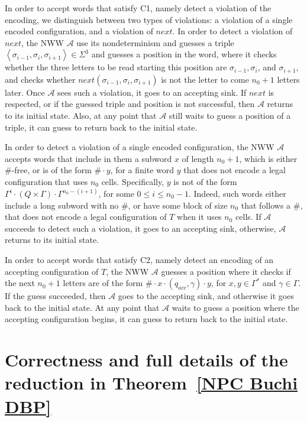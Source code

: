 \documentclass[10pt,a4paper]{amsart}
\theoremstyle{definition}
\numberwithin{equation}{section}
\newcommand{\A}{{\mathcal A}}
\newcommand{\zug}[1]{\left\langle #1 \right\rangle}
\begin{document}
In order to accept words that satisfy C1, namely detect a violation of the encoding, we distinguish between two types of violations: a violation of a single encoded configuration, and a violation of $next$. 
In order to detect a violation of $next$, the NWW $\A$ use its
nondeterminism and guesses a triple $\zug{\sigma_{i-1},\sigma_i,\sigma_{i+1}} \in \Sigma^3$ and guesses a position in the word, where it checks whether the three letters
to be read starting this position are $\sigma_{i-1},\sigma_i$, and
$\sigma_{i+1}$, and checks whether
$next(\sigma_{i-1},\sigma_i,\sigma_{i+1})$ is not the
letter to come $n_0+1$ letters later.
Once $\A$ sees such a violation, it goes to an accepting sink. If $next$ is respected, 
or if the guessed triple and position is not successful, then $\A$ returns to its initial state. Also, at any point that $\A$ still waits to guess a position of a triple, it can guess to return back to the initial state.

In order to detect a violation of a single encoded configuration, the NWW $\A$ accepts words that include in them a subword $x$ of length $n_0+1$, which is either $\#$-free, or is of the form $\#\cdot y$, for a finite word $y$ that does not encode a legal configuration that uses $n_0$ cells. Specifically, $y$ is not of the form $\Gamma^i \cdot (Q\times \Gamma) \cdot \Gamma^{n_0-(i+1)}$, for some $0 \leq i \leq n_0-1$.
Indeed, such words either include a long subword with no $\#$, 
or have some block of size $n_0$ that follows a $\#$, that does not encode a legal configuration of $T$ when it uses $n_0$ cells. 
If $\A$ succeeds to detect such a violation, it goes to an accepting sink, otherwise, $\A$ returns to its initial state.	
	
	

In order to accept words that satisfy C2, namely detect an encoding of an accepting configuration of $T$, the NWW $\A$ guesses a position where it checks if the next $n_0+1$ letters are of the form $\# \cdot x\cdot (q_{acc},\gamma)\cdot y$, for $x,y\in \Gamma^*$ and $\gamma\in \Gamma$. 
If the guess succeeded, then $\A$ goes to the accepting sink, and otherwise it goes back to the initial state. At any point that $\A$ waits to guess a position where the accepting configuration begins, it can guess to return back to the initial state.

\section{Correctness and full details of the reduction in Theorem~\ref{NPC Buchi DBP}}
\label{app np HDnbw}
\end{document}
